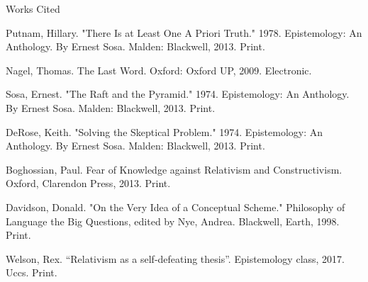 \documentclass[12pt]{article}
\newcommand{\bibent}{\noindent \hangindent 40pt}
\newenvironment{workscited}{\newpage \begin{center} Works Cited \end{center}}{\newpage }
\begin{document}
\begin{flushleft}
\begin{workscited}
    \bibent Putnam, Hillary. "There Is at Least One A Priori Truth." 1978. Epistemology: An Anthology. By Ernest Sosa. Malden: Blackwell, 2013. Print.

    \bibent Nagel, Thomas. The Last Word. Oxford: Oxford UP, 2009. Electronic.

    \bibent Sosa, Ernest. "The Raft and the Pyramid." 1974. Epistemology: An Anthology. By Ernest Sosa. Malden: Blackwell, 2013. Print.

    \bibent DeRose, Keith. "Solving the Skeptical Problem." 1974. Epistemology: An Anthology. By Ernest Sosa. Malden: Blackwell, 2013. Print.

    \bibent Boghossian, Paul. Fear of Knowledge against Relativism and Constructivism. Oxford, Clarendon Press, 2013. Print.

    \bibent Davidson, Donald. "On the Very Idea of a Conceptual Scheme." Philosophy of Language the Big Questions, edited by Nye, Andrea. Blackwell, Earth, 1998. Print.

    \bibent Welson, Rex. ``Relativism as a self-defeating thesis''. Epistemology class, 2017.  Uccs. Print.


\end{workscited}

\end{flushleft}
\end{document}
